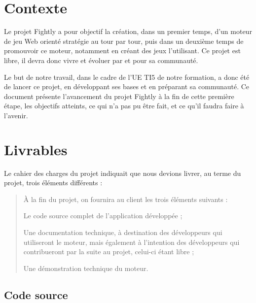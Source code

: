 \documentclass[a4paper,10pt]{report}
\begin{document}
  

  \tableofcontents

  \setlength{\parskip}{0.1in}

  \chapter{Contexte}

  Le projet Fightly a pour objectif la création, dans un premier temps, d'un moteur de jeu Web orienté stratégie au tour par tour, puis dans un deuxième temps de promouvoir ce moteur, notamment en créant des jeux l'utilisant. Ce projet est libre, il devra donc vivre et évoluer par et pour sa communauté. 

  Le but de notre travail, dans le cadre de l'UE TI5 de notre formation, a donc été de lancer ce projet, en développant ses bases et en préparant sa communauté. Ce document présente l'avancement du projet Fightly à la fin de cette première étape, les objectifs atteints, ce qui n'a pas pu être fait, et ce qu'il faudra faire à l'avenir. 

  \chapter{Livrables}

  Le cahier des charges du projet indiquait que nous devions livrer, au terme du projet, trois éléments différents : 

  \begin{quote}
    À la fin du projet, on fournira au client les trois éléments suivants : 

    \begin{list}{-}{}
      \item{Le code source complet de l'application développée ;}
      \item{Une documentation technique, à destination des développeurs qui utiliseront le moteur, mais également à l'intention des développeurs qui contribueront par la suite au projet, celui-ci étant libre ;}
      \item{Une démonstration technique du moteur.}
    \end{list}
  \end{quote}

    \section{Code source}
\end{document}
